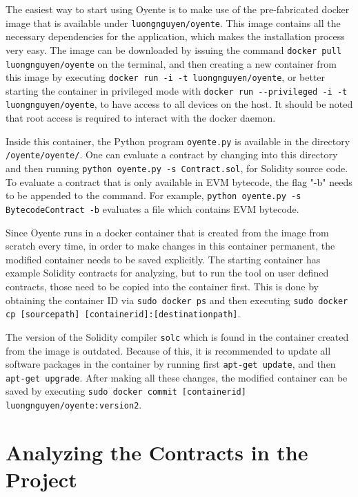 The easiest way to start using Oyente is to make use of the pre-fabricated docker image that is available under \texttt{luongnguyen/oyente}. This image contains all the necessary dependencies for the application, which makes the installation process very easy. The image can be downloaded by issuing the command \texttt{docker pull luongnguyen/oyente} on the terminal, and then creating a new container from this image by executing \texttt{docker run -i -t luongnguyen/oyente}, or better starting the container in privileged mode with \texttt{docker run -{}-privileged -i -t luongnguyen/oyente}, to have access to all devices on the host. It should be noted that root access is required to interact with the docker daemon.

Inside this container, the Python program \texttt{oyente.py} is available in the directory \texttt{/oyente/oyente/}. One can evaluate a contract by changing into this directory and then running \texttt{python oyente.py -s Contract.sol}, for Solidity source code. To evaluate a contract that is only available in EVM bytecode, the flag "-b" needs to be appended to the command. For example, \texttt{python oyente.py -s BytecodeContract -b} evaluates a file which contains EVM bytecode.

Since Oyente runs in a docker container that is created from the image from scratch every time, in order to make changes in this container permanent, the modified container needs to be saved explicitly. The starting container has example Solidity contracts for analyzing, but to run the tool on user defined contracts, those need to be copied into the container first. This is done by obtaining the container ID via \texttt{sudo docker ps} and then executing \texttt{sudo docker cp [source\textunderscore path] [container\textunderscore id]:[destination\textunderscore path]}.

The version of the Solidity compiler \texttt{solc} which is found in the container created from the image is outdated. Because of this, it is recommended to update all software packages in the container by running first \texttt{apt-get update}, and then \texttt{apt-get upgrade}. After making all these changes, the modified container can be saved by executing \texttt{sudo docker commit [container\textunderscore id] luongnguyen/oyente:version2}.

\section*{Analyzing the Contracts in the Project}

